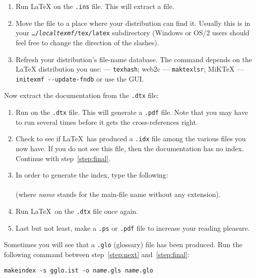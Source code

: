 \begin{enumerate}
  \item Run \LaTeX{} on the \texttt{.ins} file. This will
        extract a  file.
  \item Move the  file to a place where your distribution
        can find it. Usually this is in your \texttt{\ldots/\emph{localtexmf}/tex/latex}
        subdirectory (Windows or OS/2 users should feel free to change the
        direction of the slashes).
  \item Refresh your distribution's file-name database. The command
        depends on the \LaTeX{} distribution you use:
        \TeXLive{} --- \texttt{texhash}; web2c --- \texttt{maktexlsr};
        MiK\TeX{} --- \texttt{initexmf -{}-update-fndb} or use the GUI\@.
\end{enumerate}

\noindent Now extract the documentation from the
\texttt{.dtx} file:

\begin{enumerate}
  \item Run  on the \texttt{.dtx} file.  This will generate a
        \texttt{.pdf} file. Note that you may have to run 
        several times before it gets the cross-references right.
  \item Check to see if \LaTeX\ has produced a \texttt{.idx} file
        among the various files you now have.
        If you do not see this file, then the documentation has no index. Continue
        with step~\ref{step:final}.
  \item In order to generate the index, type the following:\\
        \\
        (where \textit{name} stands for the main-file name without any
        extension).
  \item Run \LaTeX\ on the \texttt{.dtx} file once again.\label{step:next}

  \item Last but not least, make a \texttt{.ps} or \texttt{.pdf}
        file to increase your reading pleasure.\label{step:final}

\end{enumerate}

Sometimes you will see that a \texttt{.glo}
(glossary) file has been produced. Run the following
command between
step~\ref{step:next} and~\ref{step:final}:

\noindent\texttt{makeindex -s gglo.ist -o \textit{name}.gls \textit{name}.glo}

